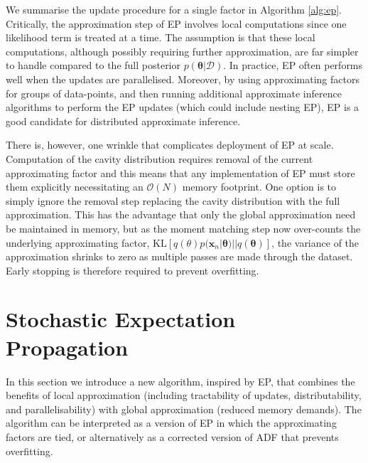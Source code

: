 We summarise the update procedure for a single factor in Algorithm \ref{alg:ep}. Critically, the approximation step of EP involves local computations since one likelihood term is treated at a time. The assumption is that these local computations, although possibly requiring further approximation, are far simpler to handle compared to the full posterior $p(\bm{\theta}| \mathcal{D})$. In practice, EP often performs well when the updates are parallelised. Moreover, by using approximating factors for groups of data-points, and then running additional approximate inference algorithms to perform the EP updates (which could include nesting EP), EP is a good candidate for distributed approximate inference.

There is, however, one wrinkle that complicates deployment of EP at scale. Computation of the cavity distribution requires removal of the current approximating factor and this means that any implementation of EP must store them explicitly necessitating an $\mathcal{O}(N)$ memory footprint. One option is to simply ignore the removal step replacing the cavity distribution with the full approximation. This has the advantage that only the global approximation need be maintained in memory, but as the moment matching step now over-counts the underlying approximating factor, $\mathrm{KL}[q(\theta) p(\bm{x}_n | \bm{\theta}) || q(\bm{\theta})]$, the variance of the approximation shrinks to zero as multiple passes are made through the dataset. Early stopping is therefore required to prevent overfitting.

\section{Stochastic Expectation Propagation}
%
In this section we introduce a new algorithm, inspired by EP, that combines the benefits of local approximation (including tractability of updates, distributability, and parallelisability) with global approximation (reduced memory demands). The algorithm can be interpreted as a version of EP in which the approximating factors are tied, or alternatively as a corrected version of ADF that prevents overfitting. 

